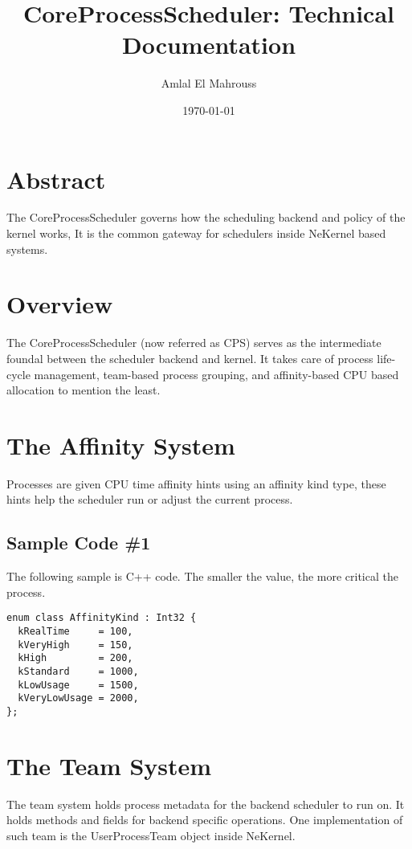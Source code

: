 \documentclass{article}
\title{CoreProcessScheduler: Technical Documentation}
\author{Amlal El Mahrouss}
\date{\today}
\begin{document}
\maketitle

\section{Abstract}

{The CoreProcessScheduler governs how the scheduling backend and policy of the kernel works, It is the common gateway for schedulers inside NeKernel based systems.}

\section{Overview}

{The CoreProcessScheduler (now referred as CPS) serves as the intermediate foundal between the scheduler backend and kernel.} {It takes care of process life-cycle management, team-based process grouping, and affinity-based CPU based allocation to mention the least.}

\section{The Affinity System}

{Processes are given CPU time affinity hints using an affinity kind type, these hints help the scheduler run or adjust the current process.}

\subsection{Sample Code \#1}

{The following sample is C++ code.} {The smaller the value, the more critical the process.}

\begin{verbatim}
enum class AffinityKind : Int32 {
  kRealTime     = 100,
  kVeryHigh     = 150,
  kHigh         = 200,
  kStandard     = 1000,
  kLowUsage     = 1500,
  kVeryLowUsage = 2000,
};
\end{verbatim}

\section{The Team System}

{The team system holds process metadata for the backend scheduler to run on. It holds methods and fields for backend specific operations.} {One implementation of such team is the UserProcessTeam object inside NeKernel.}
\end{document}
